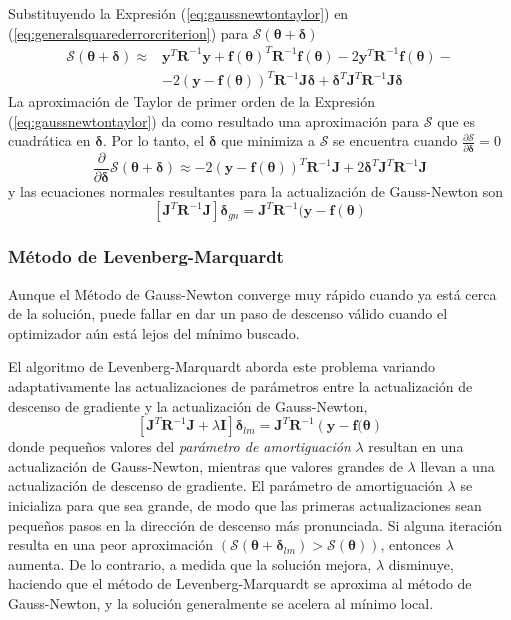Substituyendo la Expresión (\ref{eq:gaussnewtontaylor}) en (\ref{eq:generalsquarederrorcriterion}) para $\mathscr{S}(\bm{\theta} + \bm{\delta})$
\begin{equation}
    \begin{aligned}
        \mathscr{S}(\bm{\theta}+\bm{\delta}) \approx{} &\bm{y}^T\bm{R}^{-1}\bm{y} + \bm{f}(\bm{\theta})^T\bm{R}^{-1}\bm{f}(\bm{\theta}) - 2\bm{y}^T\bm{R}^{-1}\bm{f}(\bm{\theta}) - \\
        & -2\left(\bm{y} - \bm{f}(\bm{\theta})\right)^T\bm{R}^{-1}\bm{J}\bm{\delta} + \bm{\delta}^T\bm{J}^T\bm{R}^{-1}\bm{J}\bm{\delta}
    \end{aligned}
\end{equation}
La aproximación de Taylor de primer orden  de la Expresión (\ref{eq:gaussnewtontaylor}) da como resultado una aproximación para $\mathscr{S}$ que es cuadrática en $\bm{\delta}$. Por lo tanto, el $\bm{\delta}$ que minimiza a $\mathscr{S}$ se encuentra cuando $\frac{\partial \mathscr{S}}{\partial \bm{\delta}} = 0$
\begin{equation}
    \frac{\partial}{\partial \bm{\delta}}\mathscr{S}(\bm{\theta} + \bm{\delta}) \approx -2\left(\bm{y} - \bm{f}(\bm{\theta})\right)^T\bm{R}^{-1}\bm{J} + 2\bm{\delta}^T\bm{J}^T\bm{R}^{-1}\bm{J}
\end{equation}
y las ecuaciones normales resultantes para la actualización de Gauss-Newton son
\begin{equation}
    \left[\bm{J}^T\bm{R}^{-1}\bm{J}\right]\bm{\delta}_{gn} = \bm{J}^T\bm{R}^{-1}(\bm{y} - \bm{f}(\bm{\theta})
\end{equation}

\subsubsection{Método de Levenberg-Marquardt}
Aunque el Método de Gauss-Newton converge muy rápido cuando ya está cerca de la solución, puede fallar en dar un paso de descenso válido cuando el optimizador aún está lejos del mínimo buscado.

El algoritmo de Levenberg-Marquardt aborda este problema variando adaptativamente las actualizaciones de parámetros entre la actualización de descenso de gradiente y la actualización de Gauss-Newton,
\begin{equation}
    \left[\bm{J}^T\bm{R}^{-1}\bm{J} + \lambda\bm{I}\right]\bm{\delta}_{lm} = \bm{J}^T\bm{R}^{-1}\left(\bm{y} - \bm{f}(\bm{\theta}\right)
\end{equation}{}
donde pequeños valores del \textit{parámetro de amortiguación} $\lambda$ resultan en una actualización de Gauss-Newton, mientras que valores grandes de $\lambda$ llevan a una actualización de descenso de gradiente. El parámetro de amortiguación $\lambda$ se inicializa para que sea grande, de modo que las primeras actualizaciones sean pequeños pasos en la dirección de descenso más pronunciada. Si alguna iteración resulta en una peor aproximación $(\mathscr{S}(\bm{\theta} + \bm{\delta}_{lm}) > \mathscr{S}({\bm{\theta}}))$, entonces $\lambda$ aumenta. De lo contrario, a medida que la solución mejora, $\lambda$ disminuye, haciendo que el método de Levenberg-Marquardt se aproxima al método de Gauss-Newton, y la solución generalmente se acelera al mínimo local.

